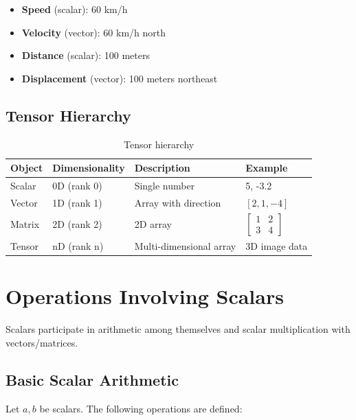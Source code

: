 \documentclass[11pt,a4paper]{article}
\begin{document}
\begin{itemize}
    \item \textbf{Speed} (scalar): 60 km/h
    \item \textbf{Velocity} (vector): 60 km/h north
\end{itemize}

\begin{itemize}
    \item \textbf{Distance} (scalar): 100 meters
    \item \textbf{Displacement} (vector): 100 meters northeast
\end{itemize}

\subsection{Tensor Hierarchy}

\begin{table}[h]
\centering
\begin{tabular}{|l|l|l|l|}
\hline
\textbf{Object} & \textbf{Dimensionality} & \textbf{Description} & \textbf{Example} \\ \hline
Scalar & 0D (rank 0) & Single number & 5, -3.2 \\ \hline
Vector & 1D (rank 1) & Array with direction & $[2, 1, -4]$ \\ \hline
Matrix & 2D (rank 2) & 2D array & $\begin{bmatrix} 1 & 2 \\ 3 & 4 \end{bmatrix}$ \\ \hline
Tensor & nD (rank n) & Multi-dimensional array & 3D image data \\ \hline
\end{tabular}
\caption{Tensor hierarchy}
\end{table}

\section{Operations Involving Scalars}

Scalars participate in arithmetic among themselves and scalar multiplication with vectors/matrices.

\subsection{Basic Scalar Arithmetic}

Let $a, b$ be scalars. The following operations are defined:
\end{document}
